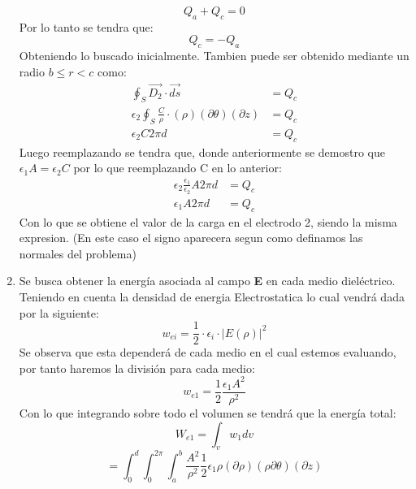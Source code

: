 \documentclass[
  11pt,
  letterpaper,
   addpoints,
  ]{exam}
\begin{document}
\begin{questions}
\begin{solution}
\begin{enumerate}
        \begin{equation}
            Q_{a} + Q_{c} = 0
        \end{equation}
        Por lo tanto se tendra que:
        \begin{equation}
            Q_{c} = -Q_{a}
        \end{equation}
        Obteniendo lo buscado inicialmente. Tambien puede ser obtenido mediante un radio $b \leq r < c$ como:
        \begin{align}
            \oint_{S} \vec{D_{2}} \cdot \vec{ds} &= Q_{c}\\  
            \epsilon_{2} \oint_{S} \frac{C}{\rho} \cdot (\rho) (\partial \theta) (\partial z) &= Q_{c}\\
            \epsilon_{2} C 2 \pi d &= Q_{c}
        \end{align}
        Luego reemplazando se tendra que, donde anteriormente se demostro que $\epsilon_{1}A = \epsilon_{2}C$ por lo que reemplazando C en lo anterior:
        \begin{align}
            \epsilon_{2} \frac{\epsilon_1}{\epsilon_2}A 2 \pi d &= Q_{c}\\
            \epsilon_{1} A 2 \pi d &= Q_{c}
        \end{align}
        Con lo que se obtiene el valor de la carga en el electrodo 2, siendo la misma expresion. (En este caso el signo aparecera segun como definamos las normales del problema)
        \item Se busca obtener la energía asociada al campo \textbf{E} en cada medio dieléctrico. Teniendo en cuenta la densidad de energia Electrostatica lo cual vendrá dada por la siguiente:
        \begin{equation}
            w_{ei} = \frac{1}{2}\cdot \epsilon_{i} \cdot |E(\rho)|^{2} 
        \end{equation}
        Se observa que esta dependerá de cada medio en el cual estemos evaluando, por tanto haremos la división para cada medio:
        \begin{equation}
            w_{e1} = \frac{1}{2}\frac{\epsilon_{1}A^{2}}{\rho^{2}}
        \end{equation}
        Con lo que integrando sobre todo el volumen se tendrá que la energía total:
        \begin{equation}
            W_{e1} =\int_{v} w_{1}dv
        \end{equation}
        \begin{equation}
            =\int_{0}^{d}  \int_{0}^{2\pi} \int_{a}^{b}\frac{A^{2}}{\rho^{2}} \frac{1}{2}\epsilon_{1} \rho(\partial\rho )(\rho \partial\theta)( \partial z)

\end{equation}
\end{enumerate}
\end{solution}
\end{questions}
\end{document}
